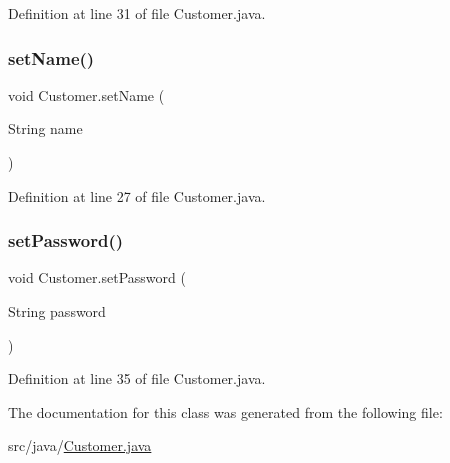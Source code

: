 Definition at line 31 of file Customer.\+java.

\mbox{\label{class_customer_a75927aaa172bff6dfd66b536486456e0}} 
\subsubsection{\texorpdfstring{setName()}{setName()}}
{\footnotesize\ttfamily void Customer.\+set\+Name (\begin{DoxyParamCaption}\item[{String}]{name }\end{DoxyParamCaption})}



Definition at line 27 of file Customer.\+java.

\mbox{\label{class_customer_a5b6fe587094c77007702ccf9840b54c0}} 
\subsubsection{\texorpdfstring{setPassword()}{setPassword()}}
{\footnotesize\ttfamily void Customer.\+set\+Password (\begin{DoxyParamCaption}\item[{String}]{password }\end{DoxyParamCaption})}



Definition at line 35 of file Customer.\+java.



The documentation for this class was generated from the following file\+:\begin{DoxyCompactItemize}
\item 
src/java/\mbox{\hyperlink{_customer_8java}{Customer.\+java}}\end{DoxyCompactItemize}
